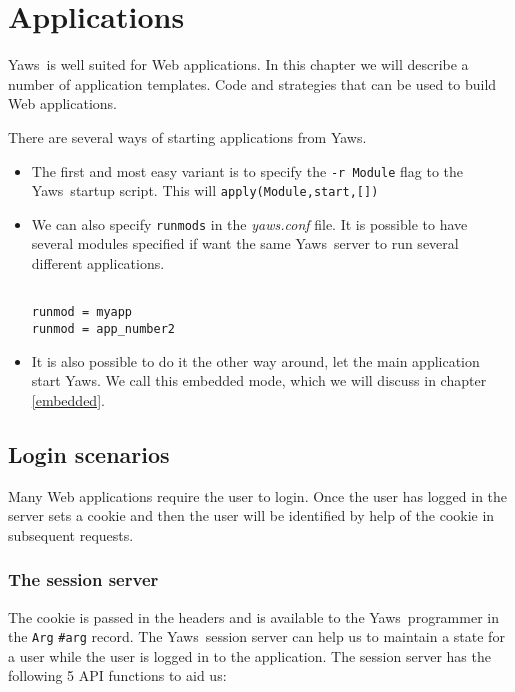 \documentclass[11pt,oneside,english]{book}
\newcommand{\Yaws}            %
        {{\sc Yaws}}
\begin{document}
\chapter{Applications}

\Yaws\  is well suited for Web applications. In this chapter we will
describe a number of application templates. Code and strategies that
can be used to build Web applications.

There are several ways of starting applications from \Yaws{}.

\begin{itemize}
\item The first and most easy variant is to specify the
  \verb+-r Module+ flag to the \Yaws\ startup script.  This will
  \verb+apply(Module,start,[])+

\item We can also specify \verb+runmods+ in the \textit{yaws.conf}
  file.  It is possible to have several modules specified if want the
  same \Yaws\ server to run several different applications.

\begin{verbatim}

runmod = myapp
runmod = app_number2

\end{verbatim}

\item It is also possible to do it the other way around, let the main
  application start \Yaws{}. We call this embedded mode, which we will
  discuss in chapter \ref{embedded}.

\end{itemize}



\section{Login scenarios}

Many Web applications require the user to login. Once the user has
logged in the server sets a cookie and then the user will be
identified by help of the cookie in subsequent requests.

\subsection{The session server}
The cookie is passed in the headers and is available to the
\Yaws\ programmer in the \verb+Arg+ \verb+#arg+ record. The
\Yaws\ session server can help us to maintain a state for a user while
the user is logged in to the application. The session server has the
following 5 API functions to aid us:
\end{document}
